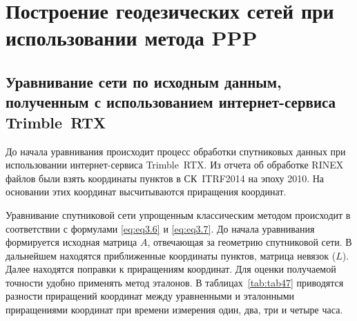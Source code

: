  
\section{Построение геодезических сетей при использовании метода PPP}\label{sec:ch3/sect3}
 
\subsection{Уравнивание сети по исходным данным, полученным с использованием интернет-сервиса Trimble~RTX}\label{subsec:ch3/sec3/sub1}
 
До начала уравнивания происходит процесс обработки спутниковых данных при использовании интернет-сервиса Trimble~RTX. Из отчета об обработке RINEX файлов были взять координаты пунктов в СК~ITRF2014 на эпоху 2010. На основании этих координат высчитываются приращения координат.
 
Уравнивание спутниковой сети упрощенным классическим методом происходит в соответствии с формулами \cref{eq:eq3.6} и \cref{eq:eq3.7}. До начала уравнивания формируется исходная матрица $A$, отвечающая за геометрию спутниковой сети. В дальнейшем находятся приближенные координаты пунктов, матрица невязок ($L$). Далее находятся поправки к приращениям координат. Для оценки получаемой точности удобно применять метод эталонов. В таблицах~\cref{tab:tab47} приводятся разности приращений координат между уравненными и эталонными приращениями координат при времени измерения один, два, три и четыре часа.


